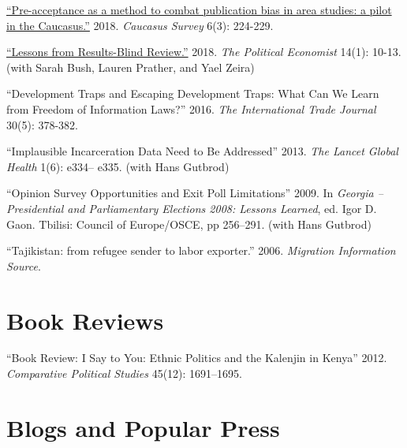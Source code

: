 \documentclass[margin,line]{res}
\begin{document}
\begin{etaremune}
\item \href{https://doi.org/10.1080/23761199.2018.1522796}{``Pre-acceptance as a method to combat publication bias in area studies: a pilot in the Caucasus.''} 2018.  \emph{Caucasus Survey} 6(3): 224-229.

\item \href{https://docs.google.com/viewer?a=v&pid=sites&srcid=dW1pY2guZWR1fHBvbGl0aWNhbC1lY29ub21pc3QtbmV3c2xldHRlcnxneDoxZjU3NWI4ZjgyMjNmN2M4}{``Lessons from Results-Blind Review.''} 2018. \emph{The Political Economist} 14(1): 10-13. (with Sarah Bush, Lauren Prather, and Yael Zeira)

 \item ``Development Traps and Escaping Development Traps: What Can We Learn from Freedom of Information Laws?'' 2016. \emph{The International Trade Journal } 30(5): 378-382.

 \item  ``Implausible Incarceration Data Need to Be Addressed'' 2013. \emph{The Lancet Global Health} 1(6): e334-- e335. (with Hans Gutbrod)

 \item ``Opinion Survey Opportunities and Exit Poll Limitations'' 2009. In \emph{Georgia -- Presidential and Parliamentary Elections 2008: Lessons Learned}, ed. Igor D. Gaon. Tbilisi: Council of Europe/OSCE, pp 256--291. (with Hans Gutbrod)

\item  ``Tajikistan: from refugee sender to labor exporter.'' 2006. \emph{Migration Information Source}.

\end{etaremune}

\section{\sc Book Reviews}

``Book Review: I Say to You: Ethnic Politics and the Kalenjin in Kenya'' 2012. \emph{Comparative Political Studies} 45(12): 1691--1695.

\section{\sc Blogs and Popular Press}
\end{document}
